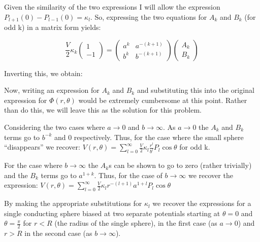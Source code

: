 \begin{homeworkProblem}[Jackson 3rd ed. : 3.1]
Given the similarity of the two expressions I will allow the expression $P_{l+1}(0)-P_{l-1}(0) = \kappa_l$. So, expressing the two equations for $A_{k}$ and $B_{k}$ (for odd k) in a matrix form yields:

\[
\frac{V}{2} \kappa_k
\begin{pmatrix}
1 \\ -1
\end{pmatrix}
=
\begin{pmatrix}
a^k & a^{-(k+1)} \\
b^k & b^{-(k+1)}
\end{pmatrix}
\begin{pmatrix}
	A_k \\ B_k
\end{pmatrix}
\]

Inverting this, we obtain:


Now, writing an expression for $A_k$ and $B_k$ and substituting this into the original expression for $\Phi(r,\theta)$ would be extremely cumbersome at this point. Rather than do this, we will leave this as the solution for this problem.
\\ \par
Considering the two cases where $a\rightarrow0$ and $b \rightarrow \infty$. As $a\rightarrow0$ the $A_k$ and $B_k$ terms go to $b^{-k}$ and 0 respectively. Thus, for the case where the small sphere ``disappears'' we recover: $V(r,\theta) = \sum\limits_{l=0}^\infty \frac{V}{2} \kappa_l\frac{r^l}{b^l}P_l\cos\theta$ for odd k.
\\ \par
For the case where $b \rightarrow \infty$ the $A_k$s can be shown to go to zero (rather trivially) and the $B_k$ terms go to $a^{1+k}$. Thus, for the case of $b \rightarrow \infty$ we recover the expression: $V(r,\theta) = \sum\limits_{l=0}^\infty \frac{V}{2} \kappa_l r^{-(l+1)} a^{1+l}P_l\cos\theta$

By making the appropriate substitutions for $\kappa_l$ we recover the expressions for a single conducting sphere biased at two separate potentials starting at $\theta = 0$ and $\theta = \frac{\pi}{2}$ for $r<R$ (the radius of the single sphere), in the first case (as $a \rightarrow 0$) and $r>R$ in the second case (as $b \rightarrow \infty$).
\end{homeworkProblem}
